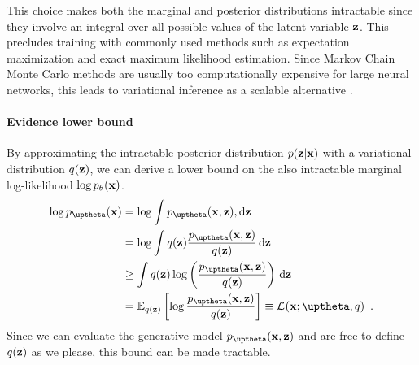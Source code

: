 This choice makes both the marginal and posterior distributions intractable since they involve an integral over all possible values of the latent variable ${\mathbf{z}}$. 
This precludes training with commonly used methods such as expectation maximization and exact maximum likelihood estimation. Since Markov Chain Monte Carlo methods are usually too computationally expensive for large neural networks, this leads to variational inference as a scalable alternative \parencite{jordan_introduction_1999}. 



\paragraph{Evidence lower bound}
By approximating the intractable posterior distribution $p({\mathbf{z}}|{\mathbf{x}})$ with a variational distribution $q({\mathbf{z}})$, we can derive a lower bound on the also intractable marginal log-likelihood $\log p_\theta({\mathbf{x}})$.
%
 \begin{align}
    \log p_\thetab(\xb)
    &= \log \int p_\thetab(\xb,\zb),\textrm{d}\zb \nonumber \\
    &= \log \int q(\zb) \frac{p_\thetab(\xb,\zb)}{q(\zb)}\,\textrm{d}\zb  \label{eq:marginal-likelihood-with-variational-approximation} \\
    &\geq \int q(\zb) \log \left( \frac{p_\thetab(\xb,\zb)}{q(\zb)} \right) \,\textrm{d}\zb \nonumber \\
    &= \mathbb{E}_{q(\zb)} \left[ \log \frac{p_\thetab(\xb,\zb)}{q(\zb)} \right] \equiv \mathcal{L}_{}(\xb;\thetab,q) \enspace . \label{eq:latent-variable-model-elbo}
\end{align}
%
Since we can evaluate the generative model $p_\thetab(\xb,\zb)$ and are free to define $q({\mathbf{z}})$ as we please, this bound can be made tractable. 

